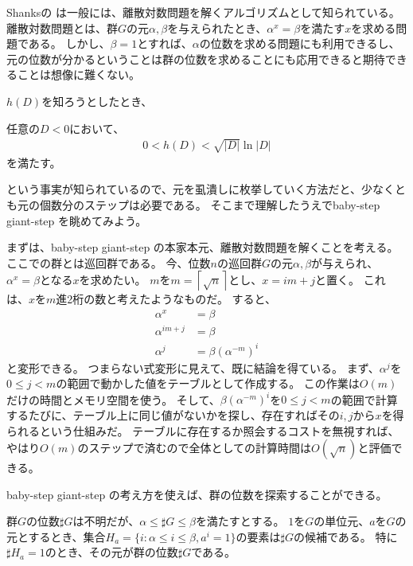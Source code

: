 Shanksの  は一般には、離散対数問題を解くアルゴリズムとして知られている。
離散対数問題とは、群$G$の元$\alpha,\beta$を与えられたとき、$\alpha^x=\beta$を満たす$x$を求める問題である。
しかし、$\beta=1$とすれば、$\alpha$の位数を求める問題にも利用できるし、元の位数が分かるということは群の位数を求めることにも応用できると期待できることは想像に難くない。

$h(D)$を知ろうとしたとき、

\begin{Prop}{}{}
任意の$D<0$において、
\begin{align*}
0 < h(D) < \sqrt{|D|}\ln{|D|}
\end{align*}
を満たす。
\end{Prop}

という事実が知られているので、元を虱潰しに枚挙していく方法だと、少なくとも元の個数分のステップは必要である。
そこまで理解したうえでbaby-step giant-step を眺めてみよう。

まずは、baby-step giant-step の本家本元、離散対数問題を解くことを考える。
ここでの群とは巡回群である。
今、位数$n$の巡回群$G$の元$\alpha,\beta$が与えられ、$\alpha^x=\beta$となる$x$を求めたい。
$m$を$m=\left\lceil \sqrt{n} \right\rceil$とし、$x=im+j$と置く。
これは、$x$を$m$進2桁の数と考えたようなものだ。
すると、
\begin{align*}
\alpha^x &= \beta\\
\alpha^{im+j} &= \beta\\
\alpha^j &= \beta(\alpha^{-m})^i
\end{align*}
と変形できる。
つまらない式変形に見えて、既に結論を得ている。
まず、$\alpha^j$を$0\le j<m$の範囲で動かした値をテーブルとして作成する。
この作業は$O(m)$だけの時間とメモリ空間を使う。
そして、$\beta(\alpha^{-m})^i$を$0\le j<m$の範囲で計算するたびに、テーブル上に同じ値がないかを探し、存在すればその$i,j$から$x$を得られるという仕組みだ。
テーブルに存在するか照会するコストを無視すれば、やはり$O(m)$のステップで済むので全体としての計算時間は$O(\sqrt{n})$と評価できる。

baby-step giant-step の考え方を使えば、群の位数を探索することができる。

\begin{Prop}{}{}
群$G$の位数$\sharp G$は不明だが、$\alpha\le\sharp G\le\beta$を満たすとする。
$1$を$G$の単位元、$a$を$G$の元とするとき、集合$H_a=\{i: \alpha\le i \le\beta, a^i = 1 \}$の要素は$\sharp G$の候補である。
特に$\sharp H_a=1$のとき、その元が群の位数$\sharp G$である。
\end{Prop}

